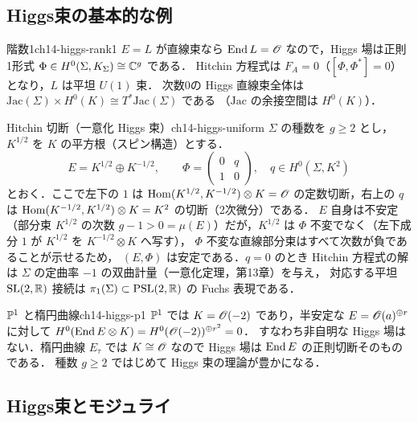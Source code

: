 \subsection{Higgs束の基本的な例}

\begin{myex}{階数1}{ch14-higgs-rank1}
$E=L$ が直線束なら $\operatorname{End} L=\mathscr{O}$ なので，Higgs 場は正則1形式 $\Phi\in H^0(\Sigma,K_\Sigma)\cong\mathbb{C}^g$ である．
Hitchin 方程式は $F_A=0$（$[\Phi,\Phi^*]=0$）となり，$L$ は平坦 $U(1)$ 束．
次数0の Higgs 直線束全体は $\mathrm{Jac}(\Sigma)\times H^0(K)\cong T^*\mathrm{Jac}(\Sigma)$ である
（$\mathrm{Jac}$ の余接空間は $H^0(K)$）．
\end{myex}

\begin{myex}{Hitchin 切断（一意化 Higgs 束）}{ch14-higgs-uniform}
$\Sigma$ の種数を $g\geq2$ とし，$K^{1/2}$ を $K$ の平方根（スピン構造）とする．
\begin{equation}
  E = K^{1/2}\oplus K^{-1/2},\qquad \Phi = \begin{pmatrix} 0 & q\\ 1 & 0\end{pmatrix},\quad q\in H^0(\Sigma,K^2)
\end{equation}
とおく．ここで左下の $1$ は $\operatorname{Hom}(K^{1/2},K^{-1/2})\otimes K = \mathscr{O}$ の定数切断，右上の $q$ は $\operatorname{Hom}(K^{-1/2},K^{1/2})\otimes K=K^2$ の切断（2次微分）である．
$E$ 自身は不安定（部分束 $K^{1/2}$ の次数 $g-1>0=\mu(E)$）だが，$K^{1/2}$ は $\Phi$ 不変でなく（左下成分 $1$ が $K^{1/2}$ を $K^{-1/2}\otimes K$ へ写す），
$\Phi$ 不変な直線部分束はすべて次数が負であることが示せるため，
$(E,\Phi)$ は安定である．$q=0$ のとき Hitchin 方程式の解は $\Sigma$ の定曲率 $-1$ の双曲計量（一意化定理，第13章）を与え，
対応する平坦 $\operatorname{SL}(2,\mathbb{R})$ 接続は $\pi_1(\Sigma)\subset\mathrm{PSL}(2,\mathbb{R})$ の Fuchs 表現である．
\end{myex}

\begin{myex}{$\mathbb{P}^1$ と楕円曲線}{ch14-higgs-p1}
$\mathbb{P}^1$ では $K=\mathscr{O}(-2)$ であり，半安定な $E=\mathscr{O}(a)^{\oplus r}$ に対して $H^0(\operatorname{End} E\otimes K)=H^0(\mathscr{O}(-2))^{\oplus r^2}=0$．
すなわち非自明な Higgs 場はない．楕円曲線 $E_\tau$ では $K\cong\mathscr{O}$ なので Higgs 場は $\operatorname{End} E$ の正則切断そのものである．
種数 $g\geq 2$ ではじめて Higgs 束の理論が豊かになる．
\end{myex}

\subsection{Higgs束とモジュライ}

